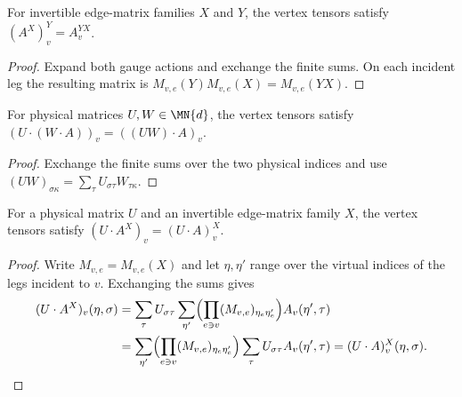\begin{lemma}%
    \label{thm:peps_gauge_action_composition}
    \leanok

    For invertible edge-matrix families $X$ and $Y$, the vertex tensors
    satisfy $(A^X)^Y_v=A^{YX}_v$.
\end{lemma}
\begin{proof}\leanok
    Expand both gauge actions and exchange the finite sums. On each
    incident leg the resulting matrix is
    $M_{v,e}(Y)M_{v,e}(X)=M_{v,e}(YX)$.
\end{proof}

\begin{lemma}%
    \label{thm:peps_physical_action_composition}
    \leanok

    For physical matrices $U,W\in\MN{d}$, the vertex tensors satisfy
    $(U\cdot(W\cdot A))_v=((UW)\cdot A)_v$.
\end{lemma}
\begin{proof}\leanok
    Exchange the finite sums over the two physical indices and use
    $(UW)_{\sigma\kappa}=\sum_\tau U_{\sigma\tau}W_{\tau\kappa}$.
\end{proof}

\begin{lemma}%
    \label{thm:peps_physical_virtual_commute}
    \leanok

    For a physical matrix $U$ and an invertible edge-matrix family $X$,
    the vertex tensors satisfy $(U\cdot A^X)_v=(U\cdot A)^X_v$.
\end{lemma}
\begin{proof}\leanok
    Write $M_{v,e}=M_{v,e}(X)$ and let $\eta,\eta'$ range over the
    virtual indices of the legs incident to $v$. Exchanging the sums gives
    \begin{align}
        (U\cdot A^X)_v(\eta,\sigma)
         & =\sum_\tau U_{\sigma\tau}\sum_{\eta'}
        \Bigl(\prod_{e\ni v}(M_{v,e})_{\eta_e\eta'_e}\Bigr)
        A_v(\eta',\tau)\notag                                               \\
         & =\sum_{\eta'}\Bigl(\prod_{e\ni v}(M_{v,e})_{\eta_e\eta'_e}\Bigr)
        \sum_\tau U_{\sigma\tau}A_v(\eta',\tau)
        =(U\cdot A)^X_v(\eta,\sigma).\notag
    \end{align}
\end{proof}

